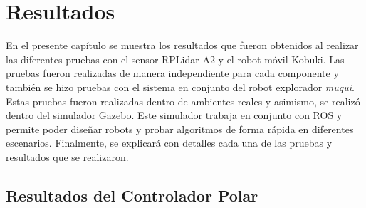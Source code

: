 \chapter{Resultados}
En el presente capítulo se muestra los resultados que fueron obtenidos al realizar
las diferentes pruebas con el sensor RPLidar A2 y el robot móvil Kobuki. Las pruebas
fueron realizadas de manera independiente para cada componente y también se hizo pruebas 
con el sistema en conjunto del robot explorador \textit{muqui}. Estas pruebas fueron 
realizadas dentro de ambientes reales y asimismo, se realizó dentro del simulador 
Gazebo. Este simulador trabaja en conjunto con ROS y permite poder diseñar robots y 
probar algoritmos de forma rápida en diferentes escenarios. Finalmente, se explicará
con detalles cada una de las pruebas y resultados que se realizaron.


\section {Resultados del Controlador Polar}

